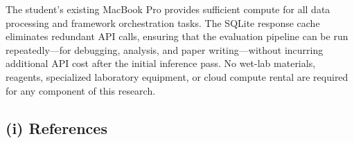 \documentclass[11pt,letterpaper]{article}
\begin{document}
The student's existing MacBook Pro provides sufficient compute for all data processing and
framework orchestration tasks. The SQLite response cache eliminates redundant API calls,
ensuring that the evaluation pipeline can be run repeatedly---for debugging, analysis, and
paper writing---without incurring additional API cost after the initial inference pass. No wet-lab
materials, reagents, specialized laboratory equipment, or cloud compute rental are required for
any component of this research.

\newpage
\subsection*{(i) References}
\end{document}
